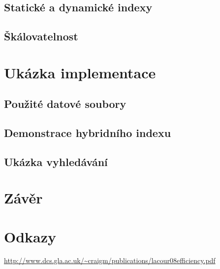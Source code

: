 \documentclass[11pt]{article}
\begin{document}
\subsection{Statické a dynamické indexy}
\subsection{Škálovatelnost}

\section{Ukázka implementace}
\subsection{Použité datové soubory}
\subsection{Demonstrace hybridního indexu}
\subsection{Ukázka vyhledávání}


\section{Závěr}

\section{Odkazy}
\url{http://www.dcs.gla.ac.uk/~craigm/publications/lacour08efficiency.pdf}


\end{document}
